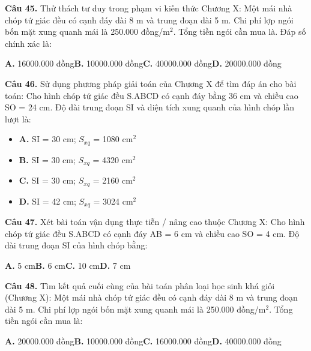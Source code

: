 \documentclass[11pt,a4paper]{article}
\begin{document}
\textbf{\color{primary} Câu 45.} Thử thách tư duy trong phạm vi kiến thức Chương X: Một mái nhà chóp tứ giác đều có cạnh đáy dài 8 m và trung đoạn dài 5 m. Chi phí lợp ngói bốn mặt xung quanh mái là 250.000 đồng/m$^2$. Tổng tiền ngói cần mua là. Đáp số chính xác là:\par
\hspace*{1.5em}\textbf{A.} 16000.000 đồng\quad\quad \textbf{B.} 10000.000 đồng\quad\quad \textbf{C.} 40000.000 đồng\quad\quad \textbf{D.} 20000.000 đồng\par\vspace{2pt}
\textbf{\color{primary} Câu 46.} Sử dụng phương pháp giải toán của Chương X để tìm đáp án cho bài toán: Cho hình chóp tứ giác đều S.ABCD có cạnh đáy bằng 36 cm và chiều cao SO = 24 cm. Độ dài trung đoạn SI và diện tích xung quanh của hình chóp lần lượt là:\par
\begin{itemize}\setlength{\itemsep}{1pt}\setlength{\parskip}{0pt}
  \item[] \textbf{A.} SI = 30 cm; $S_{xq}$ = 1080 cm$^2$
  \item[] \textbf{B.} SI = 30 cm; $S_{xq}$ = 4320 cm$^2$
  \item[] \textbf{C.} SI = 30 cm; $S_{xq}$ = 2160 cm$^2$
  \item[] \textbf{D.} SI = 42 cm; $S_{xq}$ = 3024 cm$^2$
\end{itemize}\vspace{2pt}
\textbf{\color{primary} Câu 47.} Xét bài toán vận dụng thực tiễn / nâng cao thuộc Chương X: Cho hình chóp tứ giác đều S.ABCD có cạnh đáy AB = 6 cm và chiều cao SO = 4 cm. Độ dài trung đoạn SI của hình chóp bằng:\par
\hspace*{1.5em}\textbf{A.} 5 cm\quad\quad \textbf{B.} 6 cm\quad\quad \textbf{C.} 10 cm\quad\quad \textbf{D.} 7 cm\par\vspace{2pt}
\textbf{\color{primary} Câu 48.} Tìm kết quả cuối cùng của bài toán phân loại học sinh khá giỏi (Chương X): Một mái nhà chóp tứ giác đều có cạnh đáy dài 8 m và trung đoạn dài 5 m. Chi phí lợp ngói bốn mặt xung quanh mái là 250.000 đồng/m$^2$. Tổng tiền ngói cần mua là:\par
\hspace*{1.5em}\textbf{A.} 20000.000 đồng\quad\quad \textbf{B.} 10000.000 đồng\quad\quad \textbf{C.} 16000.000 đồng\quad\quad \textbf{D.} 40000.000 đồng\par\vspace{2pt}
\end{document}
